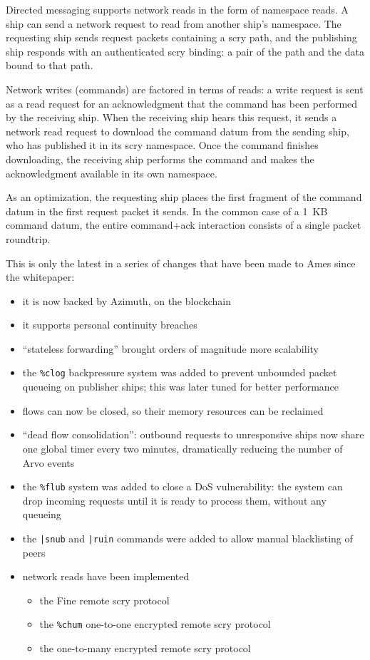 \documentclass[twoside]{article}
\begin{document}
Directed messaging supports network reads in the form of namespace reads.  A ship can send a network request to read from another ship's namespace.  The requesting ship sends request packets containing a scry path, and the publishing ship responds with an authenticated scry binding: a pair of the path and the data bound to that path. 

Network writes (commands) are factored in terms of reads: a write request is sent as a read request for an acknowledgment that the command has been performed by the receiving ship.  When the receiving ship hears this request, it sends a network read request to download the command datum from the sending ship, who has published it in its scry namespace.  Once the command finishes downloading, the receiving ship performs the command and makes the acknowledgment available in its own namespace.

As an optimization, the requesting ship places the first fragment of the command datum in the first request packet it sends.  In the common case of a 1~KB command datum, the entire command+ack interaction consists of a single packet roundtrip.

This is only the latest in a series of changes that have been made to Ames since the whitepaper:
\begin{itemize}
  \item  it is now backed by Azimuth, on the blockchain
  \item  it supports personal continuity breaches
  \item  ``stateless forwarding'' brought orders of magnitude more scalability
  \item  the \lstinline[style=inlinecode]{%clog} backpressure system was added to prevent unbounded packet queueing on publisher ships; this was later tuned for better performance
  \item  flows can now be closed, so their memory resources can be reclaimed
  \item  ``dead flow consolidation'': outbound requests to unresponsive ships now share one global timer every two minutes, dramatically reducing the number of Arvo events
  \item  the \lstinline[style=inlinecode]{%flub} system was added to close a DoS vulnerability: the system can drop incoming requests until it is ready to process them, without any queueing
  \item  the \lstinline[style=inlinecode]{|snub} and \lstinline[style=inlinecode]{|ruin} commands were added to allow manual blacklisting of peers
  \item  network reads have been implemented
  \begin{itemize}
    \item  the Fine remote scry protocol
    \item  the \lstinline[style=inlinecode]{%chum} one-to-one encrypted remote scry protocol
    \item  the one-to-many encrypted remote scry protocol
  \end{itemize}
\end{itemize}
\end{document}
